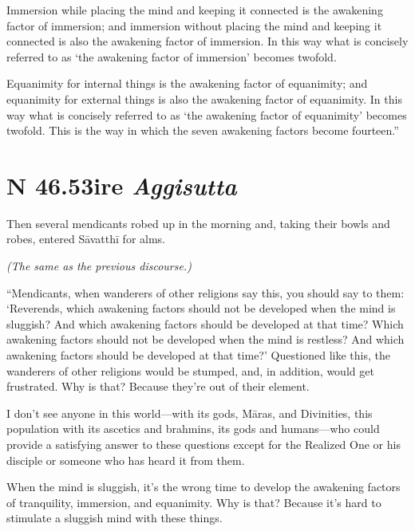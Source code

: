 \documentclass[12pt,openany]{book}%
\newcommand*{\suttatitleacronym}[1]{\smaller[2]{#1}\vspace*{.3em}}
\newcommand*{\suttatitletranslation}[1]{\linebreak{#1}}
\newcommand*{\suttatitleroot}[1]{\linebreak\smaller[2]\itshape{#1}}
\newcommand*{\tocacronym}[1]{\hspace*{-3.3em}{#1}\quad}
\newcommand*{\toctranslation}[1]{#1}
\newcommand*{\tocroot}[1]{(\textit{#1})}
\newcommand*{\scexpansioninstructions}[1]{\begin{small}\textit{#1}\end{small}}
\begin{document}
Immersion while placing the mind and keeping it connected is the awakening factor of immersion; and immersion without placing the mind and keeping it connected is also the awakening factor of immersion. In this way what is concisely referred to as ‘the awakening factor of immersion’ becomes twofold. 

Equanimity for internal things is the awakening factor of equanimity; and equanimity for external things is also the awakening factor of equanimity. In this way what is concisely referred to as ‘the awakening factor of equanimity’ becomes twofold. This is the way in which the seven awakening factors become fourteen.” 

%
\section*{{\suttatitleacronym SN 46.53}{\suttatitletranslation Fire }{\suttatitleroot Aggisutta}}
\addcontentsline{toc}{section}{\tocacronym{SN 46.53} \toctranslation{Fire } \tocroot{Aggisutta}}

Then several mendicants robed up in the morning and, taking their bowls and robes, entered \textsanskrit{Sāvatthī} for alms. 

\scexpansioninstructions{(The same as the previous discourse.) }

“Mendicants, when wanderers of other religions say this, you should say to them: ‘Reverends, which awakening factors should not be developed when the mind is sluggish? And which awakening factors should be developed at that time? Which awakening factors should not be developed when the mind is restless? And which awakening factors should be developed at that time?’ Questioned like this, the wanderers of other religions would be stumped, and, in addition, would get frustrated. Why is that? Because they’re out of their element. 

I don’t see anyone in this world—with its gods, \textsanskrit{Māras}, and Divinities, this population with its ascetics and brahmins, its gods and humans—who could provide a satisfying answer to these questions except for the Realized One or his disciple or someone who has heard it from them. 

When the mind is sluggish, it’s the wrong time to develop the awakening factors of tranquility, immersion, and equanimity. Why is that? Because it’s hard to stimulate a sluggish mind with these things. 
\end{document}
